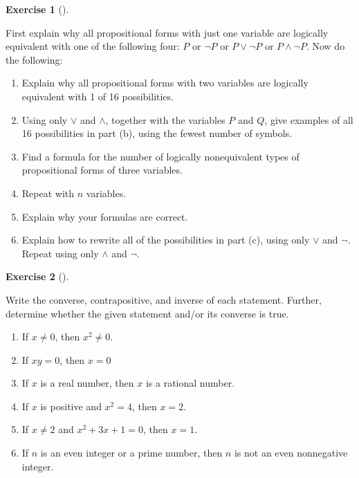 \documentclass[
  letterpaper,
  10pt,
  reqno,
  twopage,
  openany]{book}
\providecommand{\tightlist}{%
  \setlength{\itemsep}{0pt}\setlength{\parskip}{0pt}}\usepackage{longtable,booktabs,array}
\theoremstyle{plain}
\theoremstyle{definition}
\newtheorem{exercise}{Exercise}[chapter]
\theoremstyle{definition}
\theoremstyle{definition}
\theoremstyle{plain}
\theoremstyle{plain}
\theoremstyle{remark}
\begin{document}
\leavevmode{}%
\begin{exercise}[]\label{exr-1-20}

First explain why all propositional forms with just one variable are
logically equivalent with one of the following four: \(P\) or \(\neg P\)
or \(P\lor \neg P\) or \(P\land \neg P\). Now do the following:

\begin{enumerate}
\def\labelenumi{\arabic{enumi}.}
\tightlist
\item
  Explain why all propositional forms with two variables are logically
  equivalent with 1 of 16 possibilities.
\item
  Using only \(\lor\) and \(\land\), together with the variables \(P\)
  and \(Q\), give examples of all 16 possibilities in part (b), using
  the fewest number of symbols.\\
\item
  Find a formula for the number of logically nonequivalent types of
  propositional forms of three variables.\\
\item
  Repeat with \(n\) variables.
\item
  Explain why your formulas are correct.
\item
  Explain how to rewrite all of the possibilities in part (c), using
  only \(\lor\) and \(\neg\). Repeat using only \(\land\) and
  \(\neg\).\\
\end{enumerate}

\end{exercise}

\leavevmode{}%
\begin{exercise}[]\label{exr-121}

Write the converse, contrapositive, and inverse of each statement.
Further, determine whether the given statement and/or its converse is
true.

\begin{enumerate}
\def\labelenumi{\arabic{enumi}.}
\tightlist
\item
  If \(x\neq 0\), then \(x^2\neq 0\).
\item
  If \(xy=0\), then \(x=0\)
\item
  If \(x\) is a real number, then \(x\) is a rational number.\\
\item
  If \(x\) is positive and \(x^2=4\), then \(x=2\).
\item
  If \(x\neq 2\) and \(x^2+3x+1=0\), then \(x=1\).
\item
  If \(n\) is an even integer or a prime number, then \(n\) is not an
  even nonnegative integer.
\end{enumerate}

\end{exercise}
\end{document}
